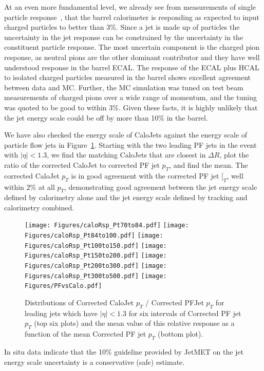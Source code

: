 At an even more fundamental level, we already see from
measurements of single particle response~\cite{PAS_JME_10-008, CMS_AN_2010/179}, that
the barrel calorimeter is responding as expected to input charged particles to better than 3\%.
Since a jet is made up of particles the uncertainty in the jet response can be 
constrained by the uncertainty in the constituent particle response.  The most uncertain
component is the charged pion response, as neutral pions are the other dominant contributor and they have well
understood response in the barrel ECAL.  The response of the ECAL plus HCAL to isolated 
charged particles measured in the barrel shows excellent agreement between
data and MC. Further, the MC simulation was tuned on test beam measurements of charged pions over
a wide range of momentum, and the tuning was quoted to be good to within 3\%.  Given these facts,
it is highly unlikely that the jet energy scale could be off by more than 10\% 
in the barrel.

We have also checked the energy scale of CaloJets against the energy scale
of particle flow jets in Figure~\ref{PFresp}.  Starting with the 
two leading PF jets in the event with $|\eta|<1.3$, we find the matching CaloJets that
are closest in $\Delta R$, plot the ratio of the corrected CaloJet to 
corrected PF jet $p_T$, and find the mean. The corrected CaloJet $p_T$ 
is in good agreement with the corrected PF jet $[_T$, well within 2\% at all 
$p_T$, demonstrating good agreement
between the jet energy scale defined by calorimetry alone and the jet energy
scale defined by tracking and calorimetry combined.
\begin{figure}[!ht]
  \begin{center}
   \texttt{[image: Figures/caloRsp\_Pt70to84.pdf]}
   \texttt{[image: Figures/caloRsp\_Pt84to100.pdf]}
   \texttt{[image: Figures/caloRsp\_Pt100to150.pdf]}
   \texttt{[image: Figures/caloRsp\_Pt150to200.pdf]}
   \texttt{[image: Figures/caloRsp\_Pt200to300.pdf]}
   \texttt{[image: Figures/caloRsp\_Pt300to500.pdf]}
   \texttt{[image: Figures/PFvsCalo.pdf]}   
    \caption{Distributions of Corrected CaloJet $p_T$ / Corrected PFJet $p_T$ 
    for leading jets which have $|\eta|<1.3$ 
    for six intervals of Corrected PF jet $p_T$ (top six plots) and the mean value of 
    this relative response as a function of the mean Corrected PF jet $p_T$ 
    (bottom plot).}
    \label{PFresp}
  \end{center}
\end{figure}

In situ data indicate that the 10\% guideline provided by JetMET on the jet energy scale uncertainty
is a conservative (safe) estimate.  

